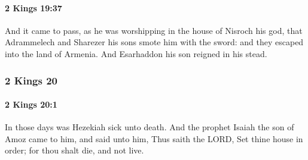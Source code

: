 		\paragraph{2 Kings 19:37} %
			\label{2KINGS-19-37}

			And it came to pass, as he was worshipping in the house of Nisroch his god, that Adrammelech and Sharezer his sons smote him with the sword: and they escaped into the land of Armenia. And Esarhaddon his son reigned in his stead.

	\subsubsection{2 Kings 20} %
		\label{2KINGS-20}

		\paragraph{2 Kings 20:1} %
			\label{2KINGS-20-1}

			In those days was Hezekiah sick unto death. And the prophet Isaiah the son of Amoz came to him, and said unto him, Thus saith the LORD, Set thine house in order; for thou shalt die, and not live.

